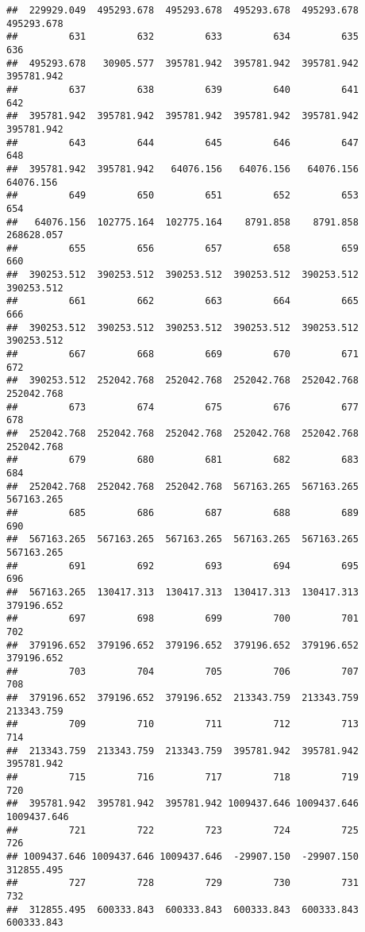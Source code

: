 \documentclass[
]{book}
\begin{document}
\begin{verbatim}
##  229929.049  495293.678  495293.678  495293.678  495293.678  495293.678 
##         631         632         633         634         635         636 
##  495293.678   30905.577  395781.942  395781.942  395781.942  395781.942 
##         637         638         639         640         641         642 
##  395781.942  395781.942  395781.942  395781.942  395781.942  395781.942 
##         643         644         645         646         647         648 
##  395781.942  395781.942   64076.156   64076.156   64076.156   64076.156 
##         649         650         651         652         653         654 
##   64076.156  102775.164  102775.164    8791.858    8791.858  268628.057 
##         655         656         657         658         659         660 
##  390253.512  390253.512  390253.512  390253.512  390253.512  390253.512 
##         661         662         663         664         665         666 
##  390253.512  390253.512  390253.512  390253.512  390253.512  390253.512 
##         667         668         669         670         671         672 
##  390253.512  252042.768  252042.768  252042.768  252042.768  252042.768 
##         673         674         675         676         677         678 
##  252042.768  252042.768  252042.768  252042.768  252042.768  252042.768 
##         679         680         681         682         683         684 
##  252042.768  252042.768  252042.768  567163.265  567163.265  567163.265 
##         685         686         687         688         689         690 
##  567163.265  567163.265  567163.265  567163.265  567163.265  567163.265 
##         691         692         693         694         695         696 
##  567163.265  130417.313  130417.313  130417.313  130417.313  379196.652 
##         697         698         699         700         701         702 
##  379196.652  379196.652  379196.652  379196.652  379196.652  379196.652 
##         703         704         705         706         707         708 
##  379196.652  379196.652  379196.652  213343.759  213343.759  213343.759 
##         709         710         711         712         713         714 
##  213343.759  213343.759  213343.759  395781.942  395781.942  395781.942 
##         715         716         717         718         719         720 
##  395781.942  395781.942  395781.942 1009437.646 1009437.646 1009437.646 
##         721         722         723         724         725         726 
## 1009437.646 1009437.646 1009437.646  -29907.150  -29907.150  312855.495 
##         727         728         729         730         731         732 
##  312855.495  600333.843  600333.843  600333.843  600333.843  600333.843 

\end{verbatim}
\end{document}
